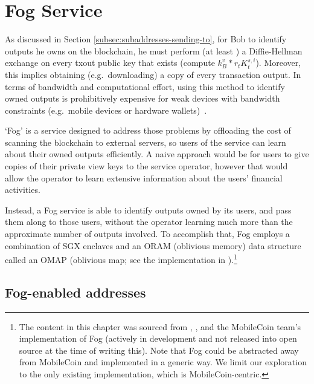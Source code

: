 \chapter{Fog Service}
\label{chapter:fog-service}

As discussed in Section \ref{subsec:subaddresses-sending-to}, for Bob to identify outputs he owns on the blockchain, he must perform (at least \cite{reduce-scan-times-view-tag-research-issue-73}) a Diffie-Hellman exchange on every txout public key that exists (compute $k_B^v*r_t K_t^{s,i}$). Moreover, this implies obtaining (e.g.\ downloading) a copy of every transaction output. In terms of bandwidth and computational effort, using this method to identify owned outputs is prohibitively expensive for weak devices with bandwidth constraints (e.g.\ mobile devices or hardware wallets)~\cite{mobilecoin-whitepaper}.

`Fog' is a service designed to address those problems by offloading the cost of scanning the blockchain to external servers, so users of the service can learn about their owned outputs efficiently. A naive approach would be for users to give copies of their private view keys to the service operator, however that would allow the operator to learn extensive information about the users' financial activities.

Instead, a Fog service is able to identify outputs owned by its users, and pass them along to those users, without the operator learning much more than the approximate number of outputs involved. To accomplish that, Fog employs a combination of SGX enclaves and an ORAM (oblivious memory) data structure called an OMAP (oblivious map; see the implementation in \cite{mobilecoin-omap-source-code}).\footnote{The content in this chapter was sourced from \cite{privacy-properties-mobilecoin-fog}, \cite{mobilecoin-fog-rfc-fog-without-user-table}, and the MobileCoin team's implementation of Fog (actively in development and not released into open source at the time of writing this). Note that Fog could be abstracted away from MobileCoin and implemented in a generic way. We limit our exploration to the only existing implementation, which is MobileCoin-centric.}%



\section{Fog-enabled addresses}
\label{sec:fog-enabled-addresses}

